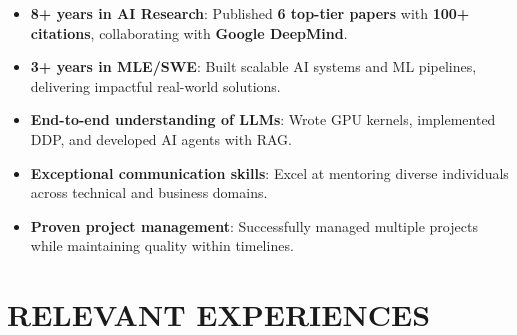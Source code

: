 \documentclass[11pt,a4paper,roman,colorlinks,linkcolor=blue,filecolor=magenta,urlcolor=cyan]{moderncv}        %
\begin{document}
\begin{itemize}
    \item \textbf{8+ years in AI Research}: Published \textbf{6 top-tier papers} with \textbf{100+ citations}, collaborating with \textbf{Google DeepMind}.
    \item \textbf{3+ years in MLE/SWE}: Built scalable AI systems and ML pipelines, delivering impactful real-world solutions.
    \item \textbf{End-to-end understanding of LLMs}: Wrote GPU kernels, implemented DDP, and developed AI agents with RAG.
    \item \textbf{Exceptional communication skills}: Excel at mentoring diverse individuals across technical and business domains.
    \item \textbf{Proven project management}: Successfully managed multiple projects while maintaining quality within timelines.
\end{itemize}
\vspace{-2mm}
\section{RELEVANT EXPERIENCES}
\end{document}
